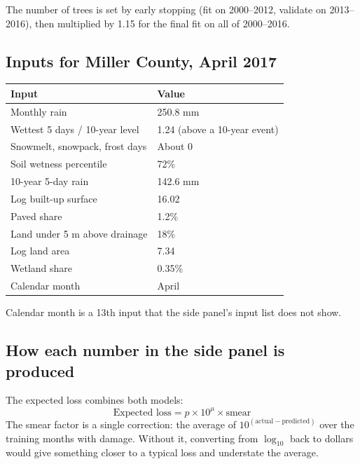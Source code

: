 \documentclass[11pt]{article}
\begin{document}
\noindent The number of trees is set by early stopping (fit on 2000--2012, validate on 2013--2016),
then multiplied by 1.15 for the final fit on all of 2000--2016.

\subsection*{Inputs for Miller County, April 2017}

\begin{table}[H]
\centering
\small
\begin{tabular}{ll}
\toprule
\textbf{Input} & \textbf{Value} \\
\midrule
Monthly rain & 250.8 mm \\
Wettest 5 days / 10-year level & 1.24 (above a 10-year event) \\
Snowmelt, snowpack, frost days & About 0 \\
Soil wetness percentile & 72\% \\
10-year 5-day rain & 142.6 mm \\
Log built-up surface & 16.02 \\
Paved share & 1.2\% \\
Land under 5 m above drainage & 18\% \\
Log land area & 7.34 \\
Wetland share & 0.35\% \\
Calendar month & April \\
\bottomrule
\end{tabular}
\end{table}

\noindent Calendar month is a 13th input that the side panel's input list does not show.

\subsection*{How each number in the side panel is produced}

The expected loss combines both models:
\[
\text{Expected loss} = p \times 10^{\mu} \times \text{smear}
\]
The smear factor is a single correction: the average of $10^{(\text{actual} - \text{predicted})}$
over the training months with damage. Without it, converting from $\log_{10}$ back to dollars would
give something closer to a typical loss and understate the average.
\end{document}
